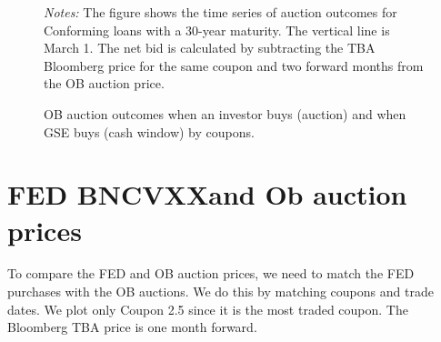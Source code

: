 \documentclass[11pt,a4paper]{article}
\begin{document}
\begin{figure}[]
   \caption{OB auction outcomes when an investor buys (auction) and when GSE buys (cash window) by coupons. } 
   \begin{minipage}{\textwidth}
      \footnotesize{\textit{Notes:} The figure shows the time series of auction outcomes for Conforming loans with a 30-year maturity.  The vertical line is March 1. The net bid is calculated by subtracting the TBA Bloomberg price for the same coupon and two forward months from the OB auction price. }
      \end{minipage}
\end{figure}


\pagebreak
  \section{FED BNCVXXand Ob auction prices}

  To compare the FED and OB auction prices, we need to match the FED purchases with the OB auctions. We do this by matching coupons and trade dates. We plot only Coupon 2.5 since it is the most traded coupon. The Bloomberg TBA price is one month forward.
\end{document}
